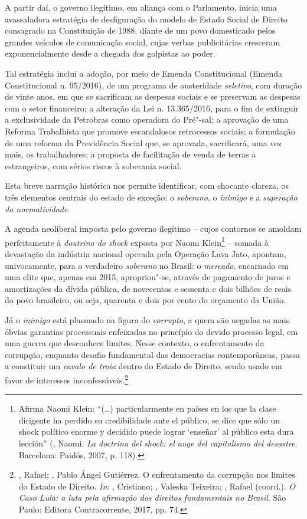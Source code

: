 A partir daí, o governo ilegítimo, em aliança com o Parlamento, inicia
uma avassaladora estratégia de desfiguração do modelo de Estado Social
de Direito consagrado na Constituição de 1988, diante de um povo
domesticado pelos grandes veículos de comunicação social, cujas verbas
publicitárias cresceram exponencialmente desde a chegada dos golpistas
ao poder.

Tal estratégia inclui a adoção, por meio de Emenda Constitucional
(Emenda Constitucional n. 95/2016), de um programa de austeridade
\emph{seletivo}, com duração de vinte anos, em que se sacrificam as
despesas sociais e se preservam as despesas com o setor financeiro; a
alteração da Lei n. 13.365/2016, para o fim de extinguir a exclusividade
da Petrobras como operadora do Pré"-sal; a aprovação de uma Reforma
Trabalhista que promove escandalosos retrocessos sociais; a formulação
de uma reforma da Previdência Social que, se aprovada, sacrificará, uma
vez mais, os trabalhadores; a proposta de facilitação de venda de terras
a estrangeiros, com sérios riscos à soberania social.

Esta breve narração histórica nos permite identificar, com chocante
clareza, os três elementos centrais do estado de exceção: o
\emph{soberano}, o \emph{inimigo} e a \emph{superação da normatividade}.

A agenda neoliberal imposta pelo governo ilegítimo -- cujos contornos se
amoldam perfeitamente à \emph{doutrina do shock} exposta por Naomi
Klein\footnote{Afirma Naomi Klein: ``(\ldots{}) particularmente en países en
  los que la clase dirigente ha perdido su credibilidade ante el
  público, se dice que sólo un shock político enorme y decidido puede
  lograr `enseñar' al público esta dura lección'' (, Naomi.
  \emph{La doctrina del shock: el auge del capitalismo del desastre}.
  Barcelona: Paidós, 2007, p. 118).} -- somada à devastação da indústria
nacional operada pela Operação Lava Jato, apontam, univocamente, para o
verdadeiro \emph{soberano} no Brasil: o \emph{mercado}, encarnado em uma
elite que, apenas em 2015, apropriou"-se, através de pagamento de juros e
amortizações da dívida pública, de novecentos e sessenta e dois bilhões
de reais do povo brasileiro, ou seja, quarenta e dois por cento do
orçamento da União.

Já o \emph{inimigo} está plasmado na figura do \emph{corrupto}, a quem
são negadas as mais óbvias garantias processuais enfeixadas no princípio
do devido processo legal, em uma guerra que desconhece limites. Nesse
contexto, o enfrentamento da corrupção, enquanto desafio fundamental das
democracias contemporâneas, passa a constituir um \emph{cavalo de troia}
dentro do Estado de Direito, sendo usado em favor de interesses
inconfessáveis.\footnote{, Rafael; , Pablo Ángel
  Gutiérrez. O enfrentamento da corrupção nos limites do Estado de
  Direito. \emph{In}:  , Cristiano;  , Valeska
  Teixeira; , Rafael (coord.). \emph{O Caso Lula: a luta pela
  afirmação dos direitos fundamentais no Brasil}. São Paulo: Editora
  Contracorrente, 2017, pp. 74.}

